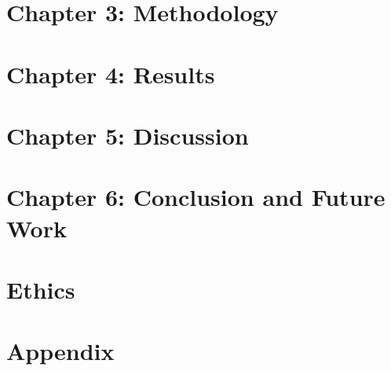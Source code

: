 \documentclass[12pt,oneside,letterpaper,english]{article}
\begin{document}
\section{Chapter 3: Methodology} \label{meth}
 
\newpage

\section{Chapter 4: Results} \label{res}
 
\newpage

\section{Chapter 5: Discussion} \label{dis}
 
\newpage

\section{Chapter 6: Conclusion and Future Work} \label{conc}

\newpage

\section{Ethics} \label{ethics}

\label{EndOfText}
\newpage

\fancyfoot[C]{\thepage}
 \begin{sloppy}
   \printbibliography
 \end{sloppy}
 
 \newpage
 \section{Appendix} \label{appen}
 
\end{document}
